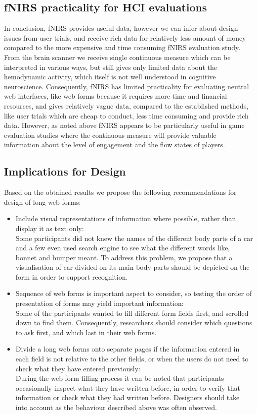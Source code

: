 \documentclass[../main/Replicate.tex]{subfiles}
\begin{document}
	\subsection{fNIRS practicality for HCI evaluations}	
	In conclusion, fNIRS provides useful data, however we can infer about design issues from user trials, and receive rich data for relatively less amount of money compared to the more expensive and time consuming fNIRS evaluation study. From the brain scanner we receive single continuous measure which can be interpreted in various ways, but still gives only limited data about the hemodynamic activity, which itself is not well understood in cognitive neuroscience. Consequently, fNIRS has limited practicality for evaluating neutral web interfaces, like web forms because it requires more time and financial resources, and gives relatively vague data, compared to the established methods, like user trials which are cheap to conduct, less time consuming and provide rich data. However, as noted above fNIRS appears to be particularly useful in game evaluation studies where the continuous measure will provide valuable information about the level of engagement\cite{harrivel2013monitoring} and the flow states\cite{yoshida2014brain} of players.
	\subsection{Implications for Design}
	Based on the obtained results we propose the following recommendations for design of long web forms:
	\begin{itemize}
		\item Include visual representations of information where possible, rather than display it as text only:\\
		Some participants did not knew the names of the different body parts of a car and a few even used search engine to see what the different words like, bonnet and bumper meant. To address this problem, we propose that a visualisation of car divided on its main body parts should be depicted on the form in order to support recognition.
		
		\item Sequence of web forms is important aspect to consider, so testing the order of presentation of forms may yield important information:\\
		Some of the participants wanted to fill different form fields first, and scrolled down to find them. Consequently, researchers should consider which questions to ask first, and which last in their web forms.
		
		\item Divide a long web forms onto separate pages if the information entered in each field is not relative to the other fields, or when the users do not need to check what they have entered previously:\\
		During the web form filling process it can be noted that participants occasionally inspect what they have written before, in order to verify that information or check what they had written before. Designers should take into account as the behaviour described above was often observed.
	\end{itemize}
	
\end{document}
